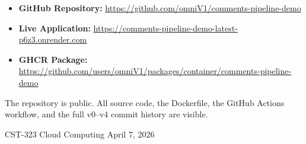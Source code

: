 \documentclass[11pt,letterpaper]{article}
\begin{document}
\begin{itemize}[nosep]
  \item \textbf{GitHub Repository:} \url{https://github.com/omniV1/comments-pipeline-demo}
  \item \textbf{Live Application:} \url{https://comments-pipeline-demo-latest-p6z3.onrender.com}
  \item \textbf{GHCR Package:} \url{https://github.com/users/omniV1/packages/container/comments-pipeline-demo}
\end{itemize}

The repository is public. All source code, the Dockerfile, the GitHub Actions workflow, and the full v0--v4 commit history are visible.

\vfill
\begin{center}
\small CST-323 Cloud Computing \textbullet{} April 7, 2026
\end{center}
\end{document}
